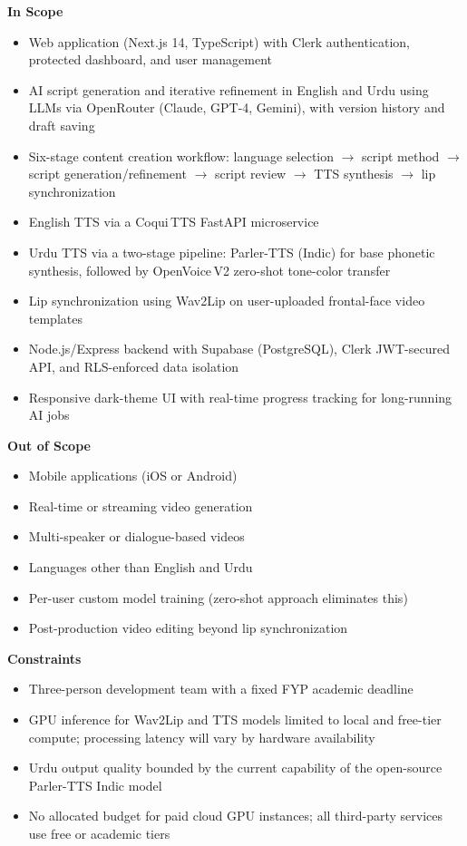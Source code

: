 ﻿\documentclass[12pt, a4paper]{article}
\begin{document}
\textbf{In Scope}
\begin{itemize}[leftmargin=1.4em, itemsep=2pt]
  \item Web application (Next.js 14, TypeScript) with Clerk authentication,
        protected dashboard, and user management
  \item AI script generation and iterative refinement in English and Urdu using
        LLMs via OpenRouter (Claude, GPT-4, Gemini), with version history and
        draft saving
  \item Six-stage content creation workflow: language selection $\to$ script
        method $\to$ script generation/refinement $\to$ script review $\to$ TTS
        synthesis $\to$ lip synchronization
  \item English TTS via a Coqui\,TTS FastAPI microservice
  \item Urdu TTS via a two-stage pipeline: Parler-TTS (Indic) for base phonetic
        synthesis, followed by OpenVoice\,V2 zero-shot tone-color transfer
  \item Lip synchronization using Wav2Lip on user-uploaded frontal-face video
        templates
  \item Node.js/Express backend with Supabase (PostgreSQL), Clerk JWT-secured
        API, and RLS-enforced data isolation
  \item Responsive dark-theme UI with real-time progress tracking for
        long-running AI jobs
\end{itemize}

\textbf{Out of Scope}
\begin{itemize}[leftmargin=1.4em, itemsep=2pt]
  \item Mobile applications (iOS or Android)
  \item Real-time or streaming video generation
  \item Multi-speaker or dialogue-based videos
  \item Languages other than English and Urdu
  \item Per-user custom model training (zero-shot approach eliminates this)
  \item Post-production video editing beyond lip synchronization
\end{itemize}

\textbf{Constraints}
\begin{itemize}[leftmargin=1.4em, itemsep=2pt]
  \item Three-person development team with a fixed FYP academic deadline
  \item GPU inference for Wav2Lip and TTS models limited to local and free-tier
        compute; processing latency will vary by hardware availability
  \item Urdu output quality bounded by the current capability of the open-source
        Parler-TTS Indic model
  \item No allocated budget for paid cloud GPU instances; all third-party
        services use free or academic tiers
\end{itemize}
\end{document}
